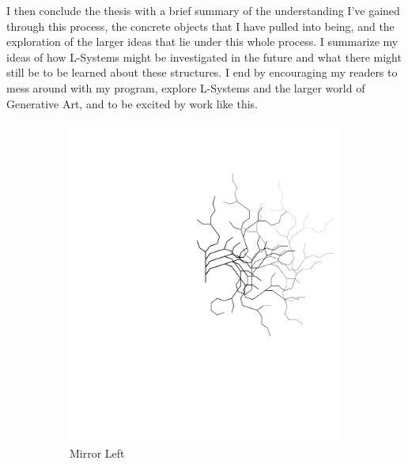 \documentclass[12pt,twoside]{reedthesis}
\begin{document}
	I then conclude the thesis with a brief summary of the understanding I've gained through this process, the concrete objects that I have pulled into being, and the exploration of the larger ideas that lie under this whole process. I summarize my ideas of how L-Systems might be investigated in the future and what there might still be to be learned about these structures. I end by encouraging my readers to mess around with my program, explore L-Systems and the larger world of Generative Art, and to be excited by work like this.
	
	\begin{figure}[h]
	\begin{subfigure}{0.5\textwidth}
		\centering
		\includegraphics[clip=true, viewport=4in 3.5in 10in 10in, scale = 0.5]{Images/ThePathWeWillFollow4A}
		\caption[Mirror Left]{Mirror Left\footnotemark}
		\label {MirrorLeft}
	\end{subfigure}
	\begin{subfigure}{0.5\textwidth}
		\centering

\end{subfigure}
\end{figure}
\end{document}
